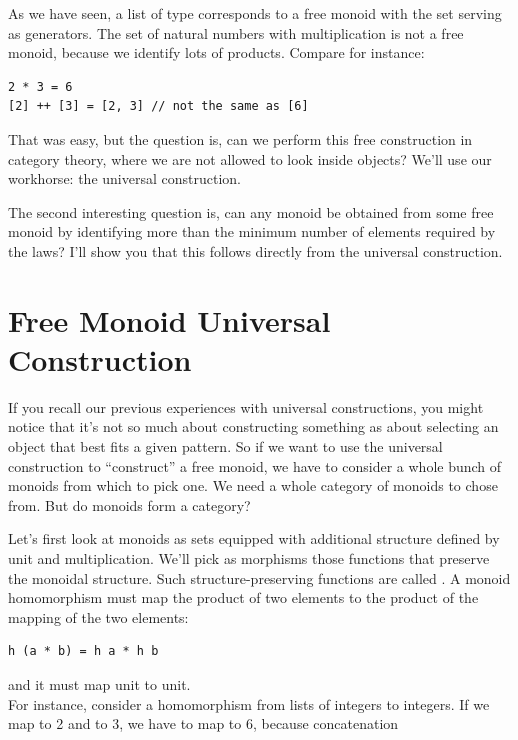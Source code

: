 As we have seen, a list of type  corresponds to a free monoid
with the set  serving as generators. The set of natural
numbers with multiplication is not a free monoid, because we identify
lots of products. Compare for instance:

\begin{Verbatim}[commandchars=\\\{\}]
2 * 3 = 6
[2] ++ [3] = [2, 3] // not the same as [6]
\end{Verbatim}
That was easy, but the question is, can we perform this free
construction in category theory, where we are not allowed to look inside
objects? We'll use our workhorse: the universal construction.

The second interesting question is, can any monoid be obtained from some
free monoid by identifying more than the minimum number of elements
required by the laws? I'll show you that this follows directly from the
universal construction.

\section{Free Monoid Universal Construction}\label{free-monoid-universal-construction}

If you recall our previous experiences with universal constructions, you
might notice that it's not so much about constructing something as about
selecting an object that best fits a given pattern. So if we want to use
the universal construction to ``construct'' a free monoid, we have to
consider a whole bunch of monoids from which to pick one. We need a
whole category of monoids to chose from. But do monoids form a category?

Let's first look at monoids as sets equipped with additional structure
defined by unit and multiplication. We'll pick as morphisms those
functions that preserve the monoidal structure. Such
structure-preserving functions are called . A monoid
homomorphism must map the product of two elements to the product of the
mapping of the two elements:

\begin{Verbatim}[commandchars=\\\{\}]
h (a * b) = h a * h b
\end{Verbatim}
and it must map unit to unit.\\
For instance, consider a homomorphism from lists of integers to
integers. If we map \code{{[}2{]}} to 2 and \code{{[}3{]}} to 3, we
have to map \code{{[}2, 3{]}} to 6, because concatenation

